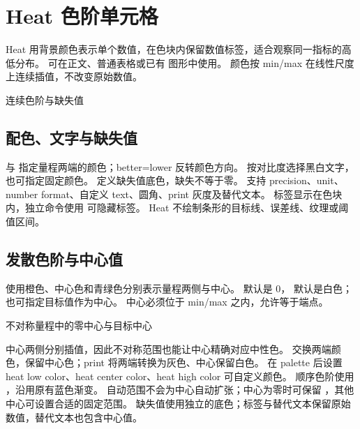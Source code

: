 \section{Heat 色阶单元格}
\label{sec:heat}
Heat 用背景颜色表示单个数值，在色块内保留数值标签，适合观察同一指标的高低分布。
 可在正文、普通表格或已有 \manualTikZ{} 图形中使用。
颜色按 min/max 在线性尺度上连续插值，不改变原始数值。
\begin{example}[text and listing,sidebyside=false]{连续色阶与缺失值}
\quad
{}\quad
{}\quad
{}
\end{example}
\subsection{配色、文字与缺失值}
 与  指定量程两端的颜色；better=lower 反转颜色方向。
 按对比度选择黑白文字，也可指定固定颜色。
 定义缺失值底色，缺失不等于零。
支持 precision、unit、number format、自定义 text、圆角、print 灰度及替代文本。
标签显示在色块内，独立命令使用  可隐藏标签。
Heat 不绘制条形的目标线、误差线、纹理或阈值区间。
\subsection{发散色阶与中心值}
 使用橙色、中心色和青绿色分别表示量程两侧与中心。
 默认是 0， 默认是白色；也可指定目标值作为中心。
中心必须位于 min/max 之内，允许等于端点。
\begin{example}[text and listing,sidebyside=false]{不对称量程中的零中心与目标中心}
\quad
{}\quad
{}

\quad
{}\quad
{}
\end{example}
中心两侧分别插值，因此不对称范围也能让中心精确对应中性色。
 交换两端颜色，保留中心色；print 将两端转换为灰色、中心保留白色。
在 palette 后设置 heat low color、heat center color、heat high color 可自定义颜色。
顺序色阶使用 ，沿用原有蓝色渐变。
自动范围不会为中心自动扩张；中心为零时可保留 ，其他中心可设置合适的固定范围。
缺失值使用独立的底色；标签与替代文本保留原始数值，替代文本也包含中心值。

